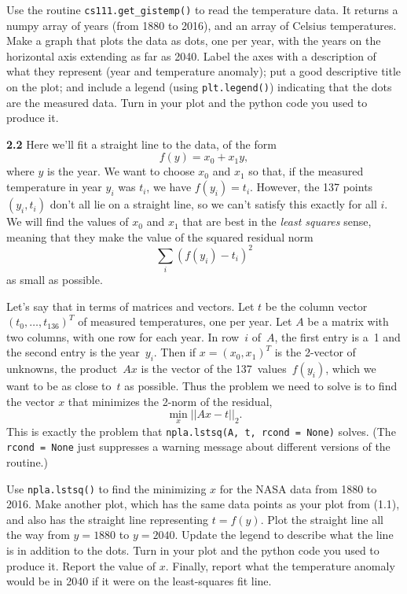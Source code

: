 \documentclass[11pt]{article}
\begin{document}
Use the routine {\tt cs111.get\_gistemp()} to read the temperature data. 
It returns a numpy array of years (from 1880 to 2016), and an array of Celsius temperatures. 
Make a graph that plots the data as dots, one per year, 
with the years on the horizontal axis extending as far as 2040. 
Label the axes with a description of what they represent (year and temperature anomaly); 
put a good descriptive title on the plot; 
and include a legend (using {\tt plt.legend()}) indicating that the dots are the measured data. 
Turn in your plot and the python code you used to produce it.

\par\medskip
{\bf 2.2}
Here we'll fit a straight line to the data, of the form 
$$f(y) = x_0 + x_1y,$$
where $y$ is the year.
We want to choose $x_0$ and $x_1$ so that,
if the measured temperature in year $y_i$ was $t_i$, 
we have $f(y_i) = t_i$. 
However, the 137 points $(y_i, t_i)$ don't all lie on a straight line,
so we can't satisfy this exactly for all $i$.
We will find the values of $x_0$ and $x_1$ that are best in the
{\em least squares} sense, meaning that they make the value of
the squared residual norm
$$\sum_i (f(y_i) - t_i)^2$$
as small as possible.

Let's say that in terms of matrices and vectors.
Let $t$ be the column vector $(t_0,\ldots,t_{136})^T$ of measured temperatures,
one per year.
Let $A$ be a matrix with two columns, with one row for each year.
In row~$i$ of~$A$, the first entry is a~1 and the second entry is the year~$y_i$.
Then if $x=(x_0,x_1)^T$ is the 2-vector of unknowns, 
the product~$Ax$ is the vector of the 137~values~$f(y_i)$, which we want to be 
as close to~$t$ as possible.
Thus the problem we need to solve is to find the vector $x$ that minimizes
the 2-norm of the residual,
$$\min_x ||Ax - t||_2.$$
This is exactly the problem that {\tt npla.lstsq(A, t, rcond = None)} solves. 
(The {\tt rcond = None} just suppresses a warning message about different versions
of the routine.)

Use {\tt npla.lstsq()} to find the minimizing $x$ for the NASA data from 1880 to 2016.
Make another plot, which has the same data points as your plot from (1.1), 
and also has the straight line representing $t = f(y)$.
Plot the straight line all the way from $y=1880$ to $y=2040$.
Update the legend to describe what the line is in addition to the dots.
Turn in your plot and the python code you used to produce it.
Report the value of $x$.
Finally, report what the temperature anomaly would be in 2040 if it were on the least-squares fit line.
\end{document}
